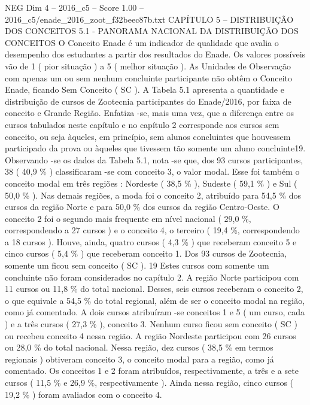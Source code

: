 \begin{textsample}{NEG Dim 4 – 2016\_c5 – Score 1.00 – 2016\_c5/enade\_2016\_zoot\_f32beec87b.txt}  \label{ex:f4_neg_252}
CAPÍTULO 5 – DISTRIBUIÇÃO DOS CONCEITOS 5.1 - PANORAMA NACIONAL DA DISTRIBUIÇÃO DOS CONCEITOS O Conceito Enade é um indicador de qualidade que avalia o desempenho dos estudantes a partir dos resultados do Enade.
Os valores possíveis vão de 1 ( pior situação ) a 5 ( melhor situação ).
As Unidades de Observação com apenas um ou sem nenhum concluinte participante não obtêm o Conceito Enade, ficando Sem Conceito ( SC ).
A Tabela 5.1 apresenta a quantidade e distribuição de cursos de Zootecnia participantes do Enade/2016, por faixa de conceito e Grande Região.
Enfatiza -se, mais uma vez, que a diferença entre os cursos tabulados neste capítulo e no capítulo 2 corresponde aos cursos sem conceito, ou seja àqueles, em princípio, sem alunos concluintes que houvessem participado da prova ou àqueles que tivessem tão somente um aluno concluinte19.
Observando -se os dados da Tabela 5.1, nota -se que, dos 93 cursos participantes, 38 ( 40,9 \% ) classificaram -se com conceito 3, o valor modal.
Esse foi também o conceito modal em três regiões : Nordeste ( 38,5 \% ), Sudeste ( 59,1 \% ) e Sul ( 50,0 \% ).
Nas demais regiões, a moda foi o conceito 2, atribuído para 54,5 \% dos cursos da região Norte e para 50,0 \% dos cursos da região Centro-Oeste.
O conceito 2 foi o segundo mais frequente em nível nacional ( 29,0 \%, correspondendo a 27 cursos ) e o conceito 4, o terceiro ( 19,4 \%, correspondendo a 18 cursos ).
Houve, ainda, quatro cursos ( 4,3 \% ) que receberam conceito 5 e cinco cursos ( 5,4 \% ) que receberam conceito 1.
Dos 93 cursos de Zootecnia, somente um ficou sem conceito ( SC ). 19 Estes cursos com somente um concluinte não foram considerados no capítulo 2.
A região Norte participou com 11 cursos ou 11,8 \% do total nacional.
Desses, seis cursos receberam o conceito 2, o que equivale a 54,5 \% do total regional, além de ser o conceito modal na região, como já comentado.
A dois cursos atribuíram -se conceitos 1 e 5 ( um curso, cada ) e a três cursos ( 27,3 \% ), conceito 3.
Nenhum curso ficou sem conceito ( SC ) ou recebeu conceito 4 nessa região.
A região Nordeste participou com 26 cursos ou 28,0 \% do total nacional.
Nessa região, dez cursos ( 38,5 \% em termos regionais ) obtiveram conceito 3, o conceito modal para a região, como já comentado.
Os conceitos 1 e 2 foram atribuídos, respectivamente, a três e a sete cursos ( 11,5 \% e 26,9 \%, respectivamente ).
Ainda nessa região, cinco cursos ( 19,2 \% ) foram avaliados com o conceito 4.

\end{textsample}
